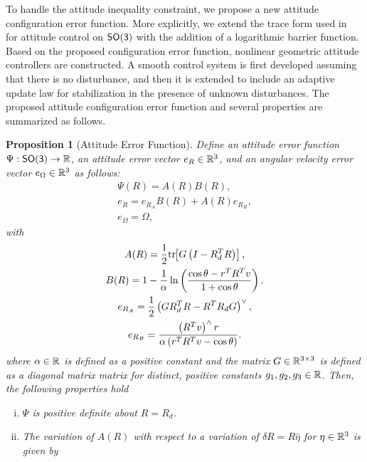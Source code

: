 \documentclass[fleqn]{IJCAS}  %
\newtheorem{prop}{Proposition}
\begin{document}
\begin{multicols}{2}
To handle the attitude inequality constraint, we propose a new attitude configuration error function. 
More explicitly, we extend the trace form used in~\cite{bullo2004,LeeITCST13} for attitude control on \(\mathsf{SO(3)}\) with the addition of a logarithmic barrier function. 
Based on the proposed configuration error function,  nonlinear geometric attitude controllers are constructed. 
A smooth control system is first developed assuming that there is  no disturbance, and then it is extended to include an adaptive update law for stabilization in the presence of unknown disturbances. 
The proposed attitude configuration error function and several properties are summarized as follows.

\begin{prop}[Attitude Error Function] \label{prop:config_error}
Define an attitude error function \( \Psi : \mathsf{SO(3)} \to \mathbb{R} \), an attitude error vector \( e_R \in \mathbb{R}^3 \), and an angular velocity error vector \( e_\Omega \in \mathbb{R}^3 \) as follows:
\begin{gather}
	\Psi(R) = A(R) B(R) , \label{eqn:psi} \\
	e_R = e_{R_A} B(R) + A(R) e_{R_B} , \label{eqn:eR} \\
	e_\Omega = \Omega , \label{eqn:eW}
\end{gather}
with
\begin{gather}
	A(R) = \frac{1}{2} \mathrm{tr}\negthickspace\left[ G \left( I - R_d^T R\right) \right] , \label{eqn:A} \\
	B(R) = 1 - \frac{1}{\alpha} \ln \left( \frac{\cos \theta -  r^T R^T v}{1 + \cos \theta}\right) . \label{eqn:B} \\
	e_{R_A} = \frac{1}{2} \left( G R_d^T R - R^T R_d G \right) ^ \vee , \label{eqn:eRA} \\
	e_{R_B} = \frac{ \left( R^T v\right)^\wedge r}{\alpha \left(r^T R^T v - \cos \theta \right)} . \label{eqn:eRB} 
\end{gather}	
where \( \alpha \in \mathbb{R} \) is defined as a positive constant and the matrix \( G \in \mathbb{R}^{3 \times 3} \) is defined as a diagonal matrix matrix for distinct, positive constants \( g_1, g_2, g_3 \in \mathbb{R} \).
Then, the following properties hold
\begin{enumerate}[(i)]
	\item \label{item:prop_psi_psd} \(\Psi\) is positive definite about \( R = R_d\).
	\item \label{item:prop_era}The variation of \( A(R) \) with respect to a variation of \( \delta R = R \hat{\eta} \) for \( \eta \in \mathbb{R}^3 \) is given by

\end{enumerate}
\end{prop}
\end{multicols}
\end{document}
